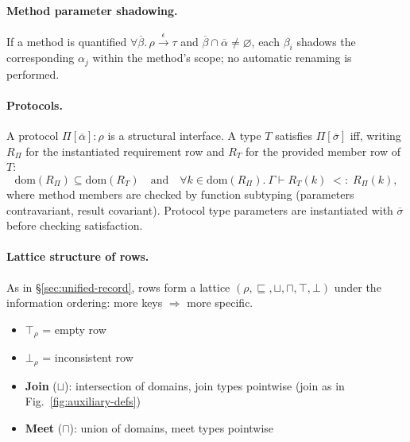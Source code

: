 \paragraph{Method parameter shadowing.}
If a method is quantified $\forall\overline{\beta}.\,\rho \xrightarrow{\epsilon} \tau$ and $\overline{\beta} \cap \overline{\alpha} \neq \varnothing$, each $\beta_i$ shadows the corresponding $\alpha_j$ within the method’s scope; no automatic renaming is performed.

\paragraph{Protocols.}
A protocol $\Pi[\overline{\alpha}]: \rho$ is a structural interface.
A type $T$ satisfies $\Pi[\overline{\sigma}]$ iff, writing $R_\Pi$ for the instantiated requirement row and $R_T$ for the provided member row of $T$:
\[
\mathrm{dom}(R_\Pi) \subseteq \mathrm{dom}(R_T)
\quad\text{and}\quad
\forall k \in \mathrm{dom}(R_\Pi).\ \Gamma \vdash R_T(k) \;<:\; R_\Pi(k),
\]
where method members are checked by function subtyping (parameters contravariant, result covariant). Protocol type parameters are instantiated with $\overline{\sigma}$ before checking satisfaction.

\paragraph{Lattice structure of rows.}
As in \S\ref{sec:unified-record}, rows form a lattice $(\mathcal{\rho}, \sqsubseteq, \sqcup, \sqcap, \top, \bot)$ under the information ordering: more keys $\Rightarrow$ more specific.
\begin{itemize}
  \item $\top_\rho$ = empty row
  \item $\bot_\rho$ = inconsistent row
  \item \textbf{Join} ($\sqcup$): intersection of domains, join types pointwise (join as in Fig.~\ref{fig:auxiliary-defs})
  \item \textbf{Meet} ($\sqcap$): union of domains, meet types pointwise
\end{itemize}

